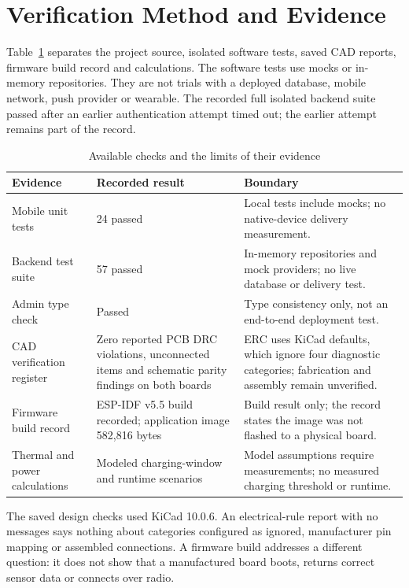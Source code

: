 \documentclass[nolineno]{ieeeaccess}
\begin{document}
\section{Verification Method and Evidence}
Table~\ref{tab:evidence} separates the project source, isolated software tests, saved CAD reports, firmware build record and calculations. The software tests use mocks or in-memory repositories. They are not trials with a deployed database, mobile network, push provider or wearable. The recorded full isolated backend suite passed after an earlier authentication attempt timed out; the earlier attempt remains part of the record.
\begin{table}[t]
\caption{Available checks and the limits of their evidence}
\label{tab:evidence}
\centering
\begin{tabular}{p{}p{}p{}}
\toprule
Evidence & Recorded result & Boundary \\
\midrule
Mobile unit tests & 24 passed & Local tests include mocks; no native-device delivery measurement. \\
Backend test suite & 57 passed & In-memory repositories and mock providers; no live database or delivery test. \\
Admin type check & Passed & Type consistency only, not an end-to-end deployment test. \\
CAD verification register & Zero reported PCB DRC violations, unconnected items and schematic parity findings on both boards & ERC uses KiCad defaults, which ignore four diagnostic categories; fabrication and assembly remain unverified. \\
Firmware build record & ESP-IDF v5.5 build recorded; application image 582,816 bytes & Build result only; the record states the image was not flashed to a physical board. \\
Thermal and power calculations & Modeled charging-window and runtime scenarios & Model assumptions require measurements; no measured charging threshold or runtime. \\
\bottomrule
\end{tabular}
\end{table}
The saved design checks used KiCad 10.0.6. An electrical-rule report with no messages says nothing about categories configured as ignored, manufacturer pin mapping or assembled connections. A firmware build addresses a different question: it does not show that a manufactured board boots, returns correct sensor data or connects over radio.
\end{document}

